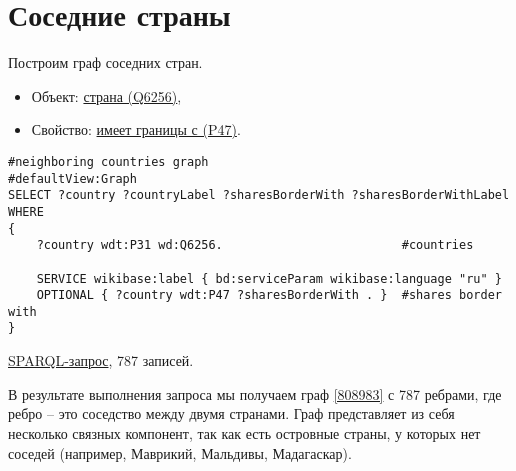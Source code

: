 \section{Соседние страны}

Построим граф соседних стран.

\begin{itemize}
    \item Объект: \href{https://www.wikidata.org/wiki/Q6256}{страна (Q6256)},
    \item Свойство: \href{https://www.wikidata.org/wiki/Property:P47}{имеет границы с (P47)}.
\end{itemize}

\begin{lstlisting}[language=SPARQL]
#neighboring countries graph
#defaultView:Graph
SELECT ?country ?countryLabel ?sharesBorderWith ?sharesBorderWithLabel
WHERE
{
    ?country wdt:P31 wd:Q6256.                         #countries

    SERVICE wikibase:label { bd:serviceParam wikibase:language "ru" }
    OPTIONAL { ?country wdt:P47 ?sharesBorderWith . }  #shares border with
}
\end{lstlisting}

\href{https://query.wikidata.org/#%23neighboring%20countries%20graph%0A%23defaultView%3AGraph%0ASELECT%20%3Fcountry%20%3FcountryLabel%20%3FsharesBorderWith%20%3FsharesBorderWithLabel%0AWHERE%0A%7B%0A%20%20%20%20%3Fcountry%20wdt%3AP31%20wd%3AQ6256.%0A%0A%20%20%20%20SERVICE%20wikibase%3Alabel%20%7B%20bd%3AserviceParam%20wikibase%3Alanguage%20%22ru%22%20%7D%0A%20%20%20%20OPTIONAL%20%7B%20%3Fcountry%20wdt%3AP47%20%3FsharesBorderWith%20.%20%7D%0A%0A%7D%0A}{SPARQL-запрос}, 787 записей.

В результате выполнения запроса мы получаем граф \ref{808983} с 787 ребрами, где ребро -- это соседство между двумя странами. Граф представляет из себя несколько связных компонент, так как есть островные страны, у которых нет соседей (например, Маврикий, Мальдивы, Мадагаскар). 

